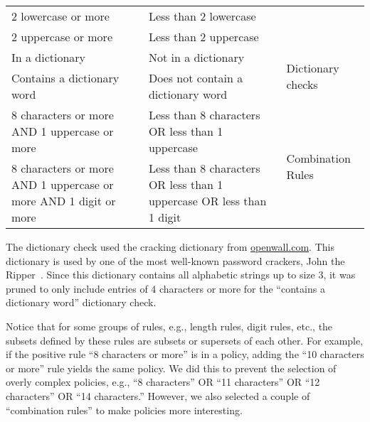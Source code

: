 \documentclass[prodmode,acmec]{ec-acmsmall}
\begin{document}
\begin{table}[htb]
{\begin{tabular}{| p{1.6in} | p{1.6in} | p{1.2in} |}
\cline{1-2}
2 lowercase or more & Less than 2 lowercase & \\
\cline{1-2}
2 uppercase or more & Less than 2 uppercase & \\
\hline
In a dictionary & Not in a dictionary & \multirow{2}{*}{Dictionary checks} \\
\cline{1-2} 
Contains a dictionary word & Does not contain a dictionary word &  \\
\hline 
8 characters or more AND 1 uppercase or more & Less than 8 characters OR less than 1 uppercase & \multirow{2}{*}{Combination Rules} \\
\cline{1-2} 
8 characters or more AND 1 uppercase or more AND 1 digit or more & Less than 8 characters OR less than 1 uppercase OR less than 1 digit & \\
\hline
\end{tabular}}
\label{tab:ExperimentRules}
\end{table}

The dictionary check used the cracking dictionary from \url{openwall.com}. This dictionary is used by one of the most well-known password crackers, John the Ripper~\cite{JTR}. Since this dictionary contains all alphabetic strings up to size 3, it was pruned to only include entries of 4 characters or more for the ``contains a dictionary word'' dictionary check.

Notice that for some groups of rules, e.g., length rules, digit rules, etc., the subsets defined by these rules are subsets or supersets of each other. For example, if the positive rule ``8 characters or more'' is in a policy, adding the ``10 characters or more'' rule yields the same policy. We did this to prevent the selection of overly complex policies, e.g., ``8 characters'' OR ``11 characters'' OR ``12 characters'' OR ``14 characters.'' However, we also selected a couple of ``combination rules'' to make policies more interesting.
\end{document}
